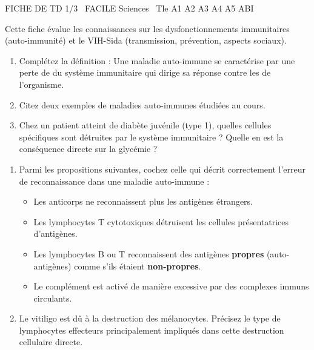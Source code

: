 \documentclass[11pt]{article}
\begin{document}
\begin{tcolorbox}[enhanced,colback=popink,colframe=popink,arc=10pt,boxrule=0pt,left=12pt,right=12pt,top=9pt,bottom=9pt]
{\color{white}\popxbold\small FICHE DE TD 1/3 \textbullet\ FACILE \hfill Sciences \textbullet\ Tle A1 A2 A3 A4 A5 ABI\par}
\end{tcolorbox}
\vspace{4pt}
Cette fiche évalue les connaissances sur les dysfonctionnements immunitaires (auto-immunité) et le VIH-Sida (transmission, prévention, aspects sociaux).

\begin{exercice}
\begin{enumerate}
    \item Complétez la définition : Une maladie auto-immune se caractérise par une perte de \underline{\hspace{4cm}} du système immunitaire qui dirige sa réponse contre les \underline{\hspace{4cm}} de l'organisme.
    \item Citez deux exemples de maladies auto-immunes étudiées au cours.
    \item Chez un patient atteint de diabète juvénile (type 1), quelles cellules spécifiques sont détruites par le système immunitaire ? Quelle en est la conséquence directe sur la glycémie ?
\end{enumerate}
\end{exercice}

\begin{exercice}
\begin{enumerate}
    \item Parmi les propositions suivantes, cochez celle qui décrit correctement l'erreur de reconnaissance dans une maladie auto-immune :
    \begin{itemize}
        \item[A.] Les anticorps ne reconnaissent plus les antigènes étrangers.
        \item[B.] Les lymphocytes T cytotoxiques détruisent les cellules présentatrices d'antigènes.
        \item[C.] Les lymphocytes B ou T reconnaissent des antigènes \textbf{propres} (auto-antigènes) comme s'ils étaient \textbf{non-propres}.
        \item[D.] Le complément est activé de manière excessive par des complexes immuns circulants.
    \end{itemize}
    \item Le vitiligo est dû à la destruction des mélanocytes. Précisez le type de lymphocytes effecteurs principalement impliqués dans cette destruction cellulaire directe.
\end{enumerate}
\end{exercice}
\end{document}
